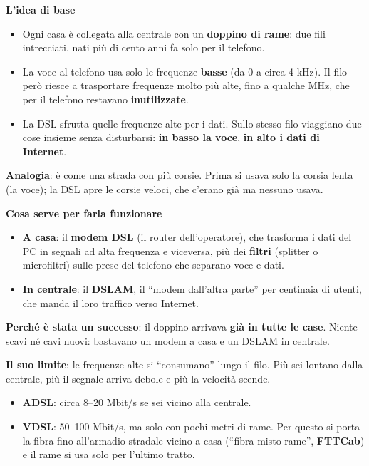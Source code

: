 \textbf{L'idea di base}

\begin{itemize}
\tightlist
\item
  Ogni casa è collegata alla centrale con un \textbf{doppino di rame}: due fili intrecciati, nati più di cento anni fa solo per il telefono.
\item
  La voce al telefono usa solo le frequenze \textbf{basse} (da 0 a circa 4 kHz). Il filo però riesce a trasportare frequenze molto più alte, fino a qualche MHz, che per il telefono restavano \textbf{inutilizzate}.
\item
  La DSL sfrutta quelle frequenze alte per i dati. Sullo stesso filo viaggiano due cose insieme senza disturbarsi: \textbf{in basso la voce}, \textbf{in alto i dati di Internet}.
\end{itemize}

\textbf{Analogia}: è come una strada con più corsie. Prima si usava solo la corsia lenta (la voce); la DSL apre le corsie veloci, che c'erano già ma nessuno usava.

\textbf{Cosa serve per farla funzionare}

\begin{itemize}
\tightlist
\item
  \textbf{A casa}: il \textbf{modem DSL} (il router dell'operatore), che trasforma i dati del PC in segnali ad alta frequenza e viceversa, più dei \textbf{filtri} (splitter o microfiltri) sulle prese del telefono che separano voce e dati.
\item
  \textbf{In centrale}: il \textbf{DSLAM}, il ``modem dall'altra parte'' per centinaia di utenti, che manda il loro traffico verso Internet.
\end{itemize}

\textbf{Perché è stata un successo}: il doppino arrivava \textbf{già in tutte le case}. Niente scavi né cavi nuovi: bastavano un modem a casa e un DSLAM in centrale.

\textbf{Il suo limite}: le frequenze alte si ``consumano'' lungo il filo. Più sei lontano dalla centrale, più il segnale arriva debole e più la velocità scende.

\begin{itemize}
\tightlist
\item
  \textbf{ADSL}: circa 8--20 Mbit/s se sei vicino alla centrale.
\item
  \textbf{VDSL}: 50--100 Mbit/s, ma solo con pochi metri di rame. Per questo si porta la fibra fino all'armadio stradale vicino a casa (``fibra misto rame'', \textbf{FTTCab}) e il rame si usa solo per l'ultimo tratto.
\end{itemize}

